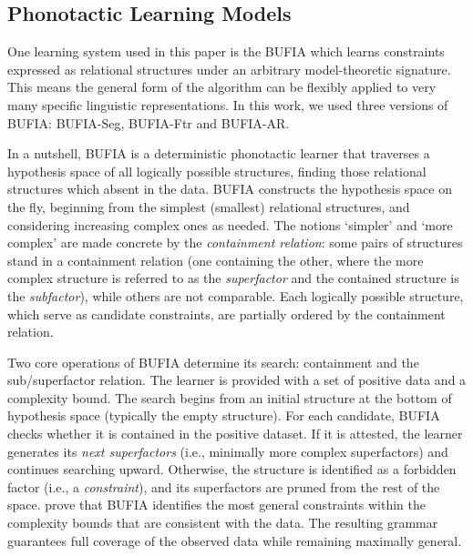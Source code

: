 \subsection{Phonotactic Learning Models}

One learning system used in this paper is the BUFIA \citep{chandleeBufia2019} which learns constraints expressed as relational structures under an arbitrary
model-theoretic signature.
This means the general form of the algorithm can be flexibly applied to very
many specific linguistic representations.
In this work, we used three versions of BUFIA: BUFIA-Seg, BUFIA-Ftr and
BUFIA-AR.

In a nutshell, BUFIA is a deterministic phonotactic learner that 
traverses a hypothesis space of all logically possible structures, 
finding those relational structures which absent in the data.
BUFIA constructs the hypothesis space on the fly,
beginning from the simplest (smallest) relational structures,
and considering increasing complex ones as needed.
The notions `simpler' and `more complex' are made concrete by the
\textit{containment relation}: some pairs of structures stand in a 
containment relation (one containing the other, where the more complex 
structure is referred to as the \textit{superfactor} and the contained 
structure is the \textit{subfactor}), while others are not comparable.
Each logically possible structure, which serve as candidate constraints, 
are partially ordered by the containment relation.
%

Two core operations of BUFIA determine its search: containment and the 
sub/superfactor relation. The learner is provided with a set of positive 
data and a complexity bound. The search begins from an initial structure 
at the bottom of hypothesis space (typically the empty structure).
For each candidate, BUFIA checks whether it is contained in the positive
dataset. If it is attested, the learner generates its \textit{next
        superfactors} (i.e., minimally more complex superfactors) and
        continues searching upward.
Otherwise, the structure is identified as a forbidden factor (i.e., a
\textit{constraint}), and its superfactors are pruned from the rest of the 
space. \citet{chandleeBufia2019} prove that BUFIA identifies the most 
general constraints within the complexity bounds that are consistent with 
the data. The resulting grammar guarantees full coverage of the observed 
data while remaining maximally general.

